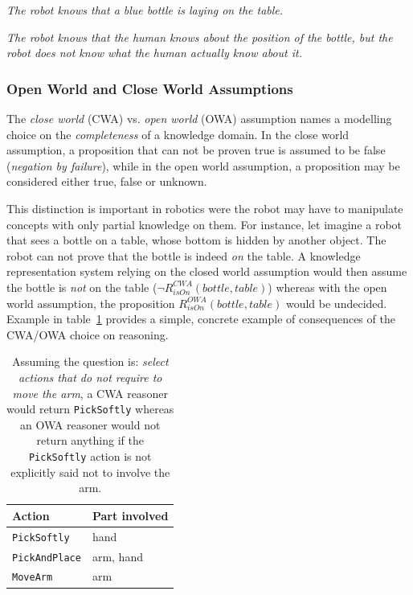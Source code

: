 \documentclass[a4paper, twocolumn]{article}
\begin{document}
\emph{The robot knows that a blue bottle is laying on the table.}

\emph{The robot knows that the human knows about the position of the bottle,
but the robot does not know what the human actually know about it.}

\subsubsection{Open World and Close World Assumptions}

The \emph{close world} (CWA) vs. \emph{open world} (OWA) assumption names a
modelling choice on the \emph{completeness} of a knowledge domain. In the close
world assumption, a proposition that can not be proven true is assumed to be
false (\emph{negation by failure}), while in the open world assumption, a
proposition may be considered either true, false or unknown.

This distinction is important in robotics were the robot may have to manipulate
concepts with only partial knowledge on them. For instance, let imagine a robot
that sees a bottle on a table, whose bottom is hidden by another object. The
robot can not prove that the bottle is indeed \emph{on} the table. A knowledge
representation system relying on the closed world assumption would then assume
the bottle is \emph{not} on the table ($\lnot R^{CWA}_{isOn}(bottle, table)$)
whereas with the open world assumption, the proposition $R^{OWA}_{isOn}(bottle,
table)$ would be undecided. Example in table~\ref{table|cwa-owa-example} provides
a simple, concrete example of consequences of the CWA/OWA choice on reasoning.

\begin{table}
	\begin{center}
	\begin{tabular}{ll}
	{\bf Action} & {\bf Part involved} \\
	\hline
	{\tt PickSoftly} & hand \\
	{\tt PickAndPlace} & arm, hand \\
	{\tt MoveArm} & arm \\
	\hline
	\end{tabular}
	\end{center}
	\caption{Assuming the question is: \emph{select actions that do not require
	to move the arm}, a CWA reasoner would return {\tt PickSoftly} whereas an
	OWA reasoner would not return anything if the {\tt PickSoftly} action is
	not explicitly said not to involve the arm.}
	\label{table|cwa-owa-example}
\end{table}
\end{document}
